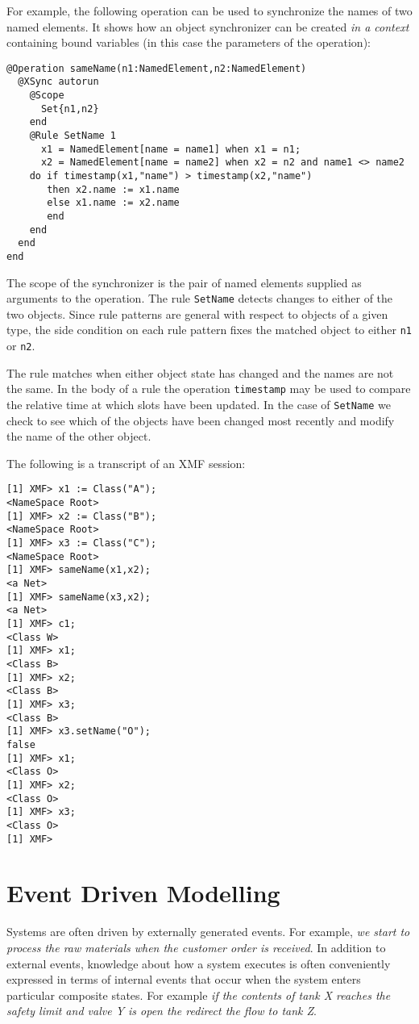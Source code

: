 \documentclass{article}
\begin{document}
For example, the following operation can be used to synchronize the
names of two named elements. It shows how an object synchronizer
can be created {\em in a context} containing bound variables (in this
case the parameters of the operation): 
\begin{verbatim}
@Operation sameName(n1:NamedElement,n2:NamedElement)
  @XSync autorun
    @Scope
      Set{n1,n2}
    end
    @Rule SetName 1
      x1 = NamedElement[name = name1] when x1 = n1;
      x2 = NamedElement[name = name2] when x2 = n2 and name1 <> name2
    do if timestamp(x1,"name") > timestamp(x2,"name")
       then x2.name := x1.name
       else x1.name := x2.name
       end
    end
  end
end
\end{verbatim}
The scope of the synchronizer is the pair of named elements supplied as 
arguments to the operation. The rule {\tt SetName} detects changes to
either of the two objects. Since rule patterns are general with respect to
objects of a given type, the side condition on each rule pattern fixes
the matched object to either {\tt n1} or {\tt n2}.

The rule matches when either object state has changed and the names are
not the same. In the body of a rule the operation {\tt timestamp} may
be used to compare the relative time at which slots have been updated.
In the case of {\tt SetName} we check to see which of the objects have
been changed most recently and modify the name of the other object.

The following is a transcript of an XMF session:
\begin{verbatim}
[1] XMF> x1 := Class("A");
<NameSpace Root>
[1] XMF> x2 := Class("B");
<NameSpace Root>
[1] XMF> x3 := Class("C");
<NameSpace Root>
[1] XMF> sameName(x1,x2);
<a Net>
[1] XMF> sameName(x3,x2);
<a Net>
[1] XMF> c1;
<Class W>
[1] XMF> x1;
<Class B>
[1] XMF> x2;
<Class B>
[1] XMF> x3;
<Class B>
[1] XMF> x3.setName("O");
false
[1] XMF> x1;
<Class O>
[1] XMF> x2;
<Class O>
[1] XMF> x3;
<Class O>
[1] XMF>
\end{verbatim}
\section{Event Driven Modelling}

Systems are often driven by externally generated events. For example, {\em we start to process
the raw materials when the customer order is received}. In addition to external events,
knowledge about how a system executes is often conveniently expressed in terms of internal
events that occur when the system enters particular composite states. For example {\em if
the contents of tank X reaches the safety limit and valve Y is open the redirect the flow to
tank Z}.
\end{document}
